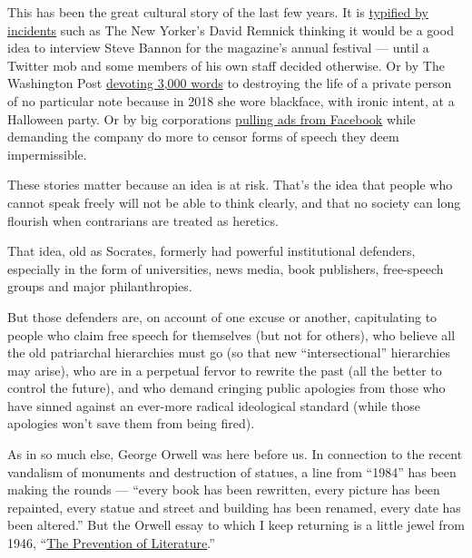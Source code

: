 This has been the great cultural story of the last few years. It is
\href{https://www.nytimes.com/2018/09/04/opinion/bannon-new-yorker-festival-remnick.html}{typified
by incidents} such as The New Yorker's David Remnick thinking it would
be a good idea to interview Steve Bannon for the magazine's annual
festival --- until a Twitter mob and some members of his own staff
decided otherwise. Or by The Washington Post
\href{https://www.washingtonpost.com/local/social-issues/blackface-incident-at-washington-post-cartoonists-2018-halloween-party-resurfaces-amid-protests/2020/06/17/66f09bde-af2e-11ea-856d-5054296735e5_story.html}{devoting
3,000 words} to destroying the life of a private person of no particular
note because in 2018 she wore blackface, with ironic intent, at a
Halloween party. Or by big corporations
\href{https://www.nytimes.com/2020/06/26/business/media/Facebook-advertising-boycott.html}{pulling
ads from Facebook} while demanding the company do more to censor forms
of speech they deem impermissible.

These stories matter because an idea is at risk. That's the idea that
people who cannot speak freely will not be able to think clearly, and
that no society can long flourish when contrarians are treated as
heretics.

That idea, old as Socrates, formerly had powerful institutional
defenders, especially in the form of universities, news media, book
publishers, free-speech groups and major philanthropies.

But those defenders are, on account of one excuse or another,
capitulating to people who claim free speech for themselves (but not for
others), who believe all the old patriarchal hierarchies must go (so
that new ``intersectional'' hierarchies may arise), who are in a
perpetual fervor to rewrite the past (all the better to control the
future), and who demand cringing public apologies from those who have
sinned against an ever-more radical ideological standard (while those
apologies won't save them from being fired).

As in so much else, George Orwell was here before us. In connection to
the recent vandalism of monuments and destruction of statues, a line
from ``1984'' has been making the rounds --- ``every book has been
rewritten, every picture has been repainted, every statue and street and
building has been renamed, every date has been altered.'' But the Orwell
essay to which I keep returning is a little jewel from 1946,
``\href{https://www.orwellfoundation.com/the-orwell-foundation/orwell/essays-and-other-works/the-prevention-of-literature/}{The
Prevention of Literature}.''

